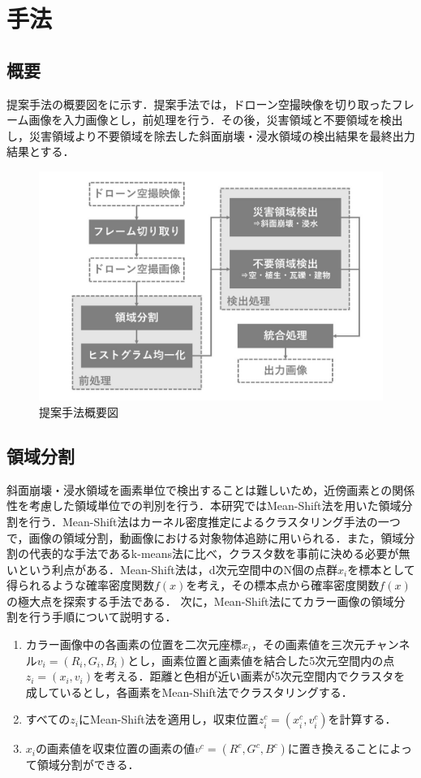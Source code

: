 \documentclass[../Thesis]{subfiles}
\begin{document}
\chapter{手法}
\section{概要}
  提案手法の概要図をに示す．提案手法では，ドローン空撮映像を切り取ったフレーム画像を入力画像とし，前処理を行う．その後，災害領域と不要領域を検出し，災害領域より不要領域を除去した斜面崩壊・浸水領域の検出結果を最終出力結果とする．

  \begin{figure}[tbp]
		\centering
		\includegraphics[width=12cm]{img/howto.jpg}
		\caption{提案手法概要図}
		\label{img01}
  \end{figure}

\section{領域分割}
  斜面崩壊・浸水領域を画素単位で検出することは難しいため，近傍画素との関係性を考慮した領域単位での判別を行う．本研究ではMean-Shift法\cite{art05}を用いた領域分割を行う．Mean-Shift法はカーネル密度推定によるクラスタリング手法の一つで，画像の領域分割，動画像における対象物体追跡に用いられる．また，領域分割の代表的な手法であるk-means法\cite{art06}に比べ，クラスタ数を事前に決める必要が無いという利点がある．Mean-Shift法は，d次元空間中のN個の点群$x_i$を標本として得られるような確率密度関数$f(x)$を考え，その標本点から確率密度関数$f(x)$の極大点を探索する手法である．
  次に，Mean-Shift法にてカラー画像の領域分割を行う手順について説明する．

  \begin{enumerate}
    \item カラー画像中の各画素の位置を二次元座標$x_i$，その画素値を三次元チャンネル$v_i=(R_i,G_i,B_i)$とし，画素位置と画素値を結合した5次元空間内の点$z_i=(x_i,v_i)$を考える．距離と色相が近い画素が5次元空間内でクラスタを成しているとし，各画素をMean-Shift法でクラスタリングする．
    \item すべての$z_i$にMean-Shift法を適用し，収束位置$z_i^c=(x_i^c,v_i^c)$を計算する．
    \item $x_i$の画素値を収束位置の画素の値$v^c=(R^c,G^c,B^c)$に置き換えることによって領域分割ができる．
  \end{enumerate}
  
\end{document}
